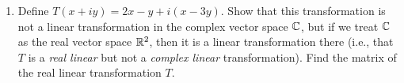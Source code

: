 \documentclass[../psets.tex]{subfiles}
\begin{document}
\begin{enumerate}[label={\textbf{3.\arabic*.}}]
\begin{enumerate}
\begin{proof}[Answer]
\begin{align*}
                \begin{pmatrix}
                    ax_1-bx_2\\
                    ax_2+bx_1\\
                \end{pmatrix}
                +
                \begin{pmatrix}
                    ay_1-by_2\\
                    ay_2+by_1\\
                \end{pmatrix}&
                    &= c
                    \begin{pmatrix}
                        ax_1-bx_2\\
                        ax_2+bx_1\\
                    \end{pmatrix}\\
                &= T
                \begin{pmatrix}
                    x_1\\
                    x_2\\
                \end{pmatrix}
                +T
                \begin{pmatrix}
                    y_1\\
                    y_2\\
                \end{pmatrix}&
                    &= cT
                    \begin{pmatrix}
                        x_1\\
                        x_2\\
                    \end{pmatrix}
            \end{align*}
            so $T$ is linear. The matrix of $T$ is
            \begin{equation*}
                \begin{pmatrix}
                    a & -b\\
                    b & a\\
                \end{pmatrix}
            \end{equation*}
        \end{proof}
        \item Define $T(x+iy)=2x-y+i(x-3y)$. Show that this transformation is not a linear transformation in the complex vector space $\mathbb{C}$, but if we treat $\mathbb{C}$ as the real vector space $\mathbb{R}^2$, then it is a linear transformation there (i.e., that $T$ is a \emph{real linear} but not a \emph{complex linear} transformation). Find the matrix of the real linear transformation $T$.

\end{enumerate}
\end{enumerate}
\end{document}
